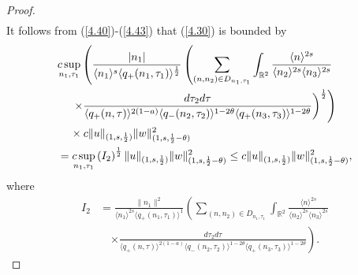\documentclass[reqno]{amsart}
\numberwithin{equation}{section}
\begin{document}
\begin{proof}
\begin{equation*}
\begin{split}
\end{split}
\end{equation*}
It follows from (\ref{4.40})-(\ref{4.43}) that (\ref{4.30}) is
bounded by
\begin{equation*}
\begin{split}
&  \underset{n_{1},\tau_{1}}{c\sup}\left(  \frac{|n_1|
}{\langle n_{1}\rangle^{s}\langle q_{+}(n_{1},\tau_{1})\rangle^{\frac{1}{2}}}\left(  \sum\limits_{(n,n_{2})\in D_{n_{1},\tau_{1}}}\int
\nolimits_{\mathbb{R}^{2}}\frac{\langle n\rangle^{2s}}{\langle n_{2}\rangle^{2s}\langle n_3\rangle^{2s}}\right.  \right. \\
&\hspace{0.4cm} \left.  \left.  \times\frac{d\tau_{2}d\tau}{\langle
q_{+}(n,\tau )\rangle^{2(1-a)}\langle
q_{-}(n_{2},\tau_{2})\rangle^{1-2\theta}\langle
q_{+}(n_3,\tau_3)\rangle^{1-2\theta}}\right)
^{\frac{1}{2}}\right) \\
&\hspace{0.4cm}  \times c\| u\| _{(1,s,\frac12
)}\| w\| _{(1,s,\frac12-\theta)}^{2}\\
&  =\underset{n_{1},\tau_{1}}{c\sup}\left(  I_{2}\right)  ^{\frac{1}{2}
}\| u\| _{(1,s,\frac12)}\| w\| _{(1,s,\frac12
-\theta)}^{2}\leq c\| u\| _{(1,s,\frac12
)}\| w\| _{(1,s,\frac12-\theta)}^{2},
\end{split}
\end{equation*}
where
\begin{align*}
I_{2}  &  =\frac{\| n_{1}\| ^{2}}{\langle
n_{1}\rangle
^{2s}\langle q_{+}(n_{1},\tau_{1})\rangle^{1}}\left(  \sum\limits_{(n,n_{2})\in
D_{n_{1},\tau_{1}}}\int\nolimits_{\mathbb{R}^{2}}\frac{\langle
n\rangle^{2s}}{\langle n_{2}\rangle^{2s}\langle n_3\rangle^{2s}
}\right. \\
&\quad  \left.  \times\frac{d\tau_{2}d\tau}{\langle
q_{+}(n,\tau)\rangle
^{2(1-a)}\langle q_{-}(n_{2},\tau_{2})\rangle^{1-2\theta}\langle q_{+}(n_3,\tau_3)\rangle^{1-2\theta}}\right)  \text{.}\end{align*}


\end{proof}
\end{document}
